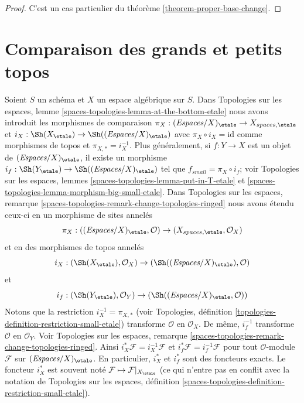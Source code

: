 \begin{proof}
C'est un cas particulier du théorème \ref{theorem-proper-base-change}.
\end{proof}










\section{Comparaison des grands et petits topos}
\label{section-compare}

\noindent
Soient $S$ un schéma et $X$ un espace algébrique sur $S$.
Dans Topologies sur les espaces, lemme
\ref{spaces-topologies-lemma-at-the-bottom-etale}
nous avons introduit les morphismes de comparaison
$\pi_X : (\textit{Espaces}/X)_\etale \to X_{spaces, \etale}$ et
$i_X : \Sh(X_\etale) \to \Sh((\textit{Espaces}/X)_\etale)$
avec $\pi_X \circ i_X = \text{id}$ comme morphismes de topos et
$\pi_{X, *} = i_X^{-1}$.
Plus généralement, si $f : Y \to X$ est un objet de $(\textit{Espaces}/X)_\etale$,
il existe un morphisme
$i_f : \Sh(Y_\etale) \to \Sh((\textit{Espaces}/X)_\etale)$
tel que $f_{small} = \pi_X \circ i_f$; voir
Topologies sur les espaces, lemmes \ref{spaces-topologies-lemma-put-in-T-etale} et
\ref{spaces-topologies-lemma-morphism-big-small-etale}. Dans
Topologies sur les espaces, remarque
\ref{spaces-topologies-remark-change-topologies-ringed}
nous avons étendu ceux-ci en un morphisme de sites annelés
$$
\pi_X :
((\textit{Espaces}/X)_\etale, \mathcal{O})
\to
(X_{spaces, \etale}, \mathcal{O}_X)
$$
et en des morphismes de topos annelés
$$
i_X :
(\Sh(X_\etale), \mathcal{O}_X)
\to
(\Sh((\textit{Espaces}/X)_\etale), \mathcal{O})
$$
et
$$
i_f :
(\Sh(Y_\etale), \mathcal{O}_Y)
\to
(\Sh((\textit{Espaces}/X)_\etale, \mathcal{O}))
$$
Notons que la restriction $i_X^{-1} = \pi_{X, *}$ (voir
Topologies, définition \ref{topologies-definition-restriction-small-etale})
transforme $\mathcal{O}$ en $\mathcal{O}_X$.
De même, $i_f^{-1}$ transforme $\mathcal{O}$ en $\mathcal{O}_Y$.
Voir Topologies sur les espaces, remarque
\ref{spaces-topologies-remark-change-topologies-ringed}.
Ainsi $i_X^*\mathcal{F} = i_X^{-1}\mathcal{F}$ et
$i_f^*\mathcal{F} = i_f^{-1}\mathcal{F}$ pour tout $\mathcal{O}$-module
$\mathcal{F}$ sur $(\textit{Espaces}/X)_\etale$. En particulier, $i_X^*$ et
$i_f^*$ sont des foncteurs exacts. Le foncteur $i_X^*$ est souvent noté
$\mathcal{F} \mapsto \mathcal{F}|_{X_\etale}$ (ce qui n'entre pas
en conflit avec la notation de Topologies sur les espaces, définition
\ref{spaces-topologies-definition-restriction-small-etale}).

